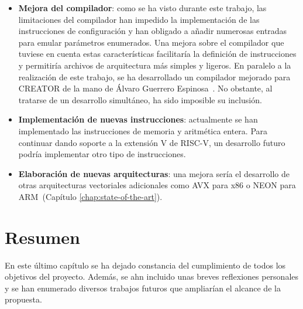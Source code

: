 \begin{itemize}
    \item \textbf{Mejora del compilador}: como se ha visto durante este trabajo, las limitaciones del compilador han impedido la implementación de las instrucciones de configuración y han obligado a añadir numerosas entradas para emular parámetros enumerados. Una mejora sobre el compilador que tuviese en cuenta estas características facilitaría la definición de instrucciones y permitiría archivos de arquitectura más simples y ligeros. En paralelo a la realización de este trabajo, se ha desarrollado un compilador mejorado para CREATOR de la mano de Álvaro Guerrero Espinosa~\cite{creatorcompiler}. No obstante, al tratarse de un desarrollo simultáneo, ha sido imposible su inclusión.

    \item\textbf{Implementación de nuevas instrucciones}: actualmente se han implementado las instrucciones de memoria y aritmética entera. Para continuar dando soporte a la extensión V de RISC-V, un desarrollo futuro podría implementar otro tipo de instrucciones.

    \item\textbf{Elaboración de nuevas arquitecturas}: una mejora sería el desarrollo de otras arquitecturas vectoriales adicionales como AVX para x86 o NEON para ARM~(Capítulo \ref{chap:state-of-the-art}).

\end{itemize}

\section{Resumen}

En este último capítulo se ha dejado constancia del cumplimiento de todos los objetivos del proyecto. Además, se ahn incluido unas breves reflexiones personales y se han enumerado diversos trabajos futuros que ampliarían el alcance de la propuesta.
